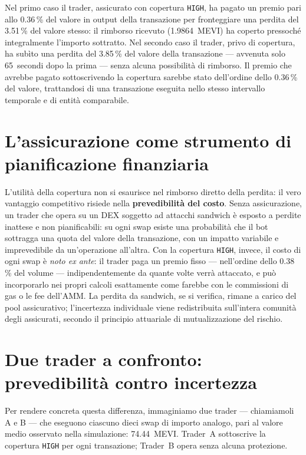 \documentclass[a4paper,11pt]{article}
\begin{document}
Nel primo caso il trader, assicurato con copertura \texttt{HIGH}, ha pagato un
premio pari allo \num{0,36}\,\% del valore in output della transazione per
fronteggiare una perdita del \num{3,51}\,\% del valore stesso: il rimborso
ricevuto (\num{1,9864}~MEVI) ha coperto pressoché integralmente l'importo
sottratto. Nel secondo caso il trader, privo di copertura, ha subìto una
perdita del \num{3,85}\,\% del valore della transazione --- avvenuta solo
65~secondi dopo la prima --- senza alcuna possibilità di rimborso. Il premio
che avrebbe pagato sottoscrivendo la copertura sarebbe stato dell'ordine dello
\num{0,36}\,\% del valore, trattandosi di una transazione eseguita nello
stesso intervallo temporale e di entità comparabile.

\section{L'assicurazione come strumento di pianificazione finanziaria}
L'utilità della copertura non si esaurisce nel rimborso diretto della perdita:
il vero vantaggio competitivo risiede nella \textbf{prevedibilità del costo}.
Senza assicurazione, un trader che opera su un DEX soggetto ad attacchi
sandwich è esposto a perdite inattese e non pianificabili: su ogni swap esiste
una probabilità che il bot sottragga una quota del valore della transazione,
con un impatto variabile e imprevedibile da un'operazione all'altra. Con la
copertura \texttt{HIGH}, invece, il costo di ogni swap è \emph{noto ex ante}:
il trader paga un premio fisso --- nell'ordine dello \num{0,38}\,\% del volume
--- indipendentemente da quante volte verrà attaccato, e può incorporarlo nei
propri calcoli esattamente come farebbe con le commissioni di gas o le fee
dell'AMM. La perdita da sandwich, se si verifica, rimane a carico del pool
assicurativo; l'incertezza individuale viene redistribuita sull'intera
comunità degli assicurati, secondo il principio attuariale di mutualizzazione
del rischio.

\section{Due trader a confronto: prevedibilità contro incertezza}

Per rendere concreta questa differenza, immaginiamo due trader --- chiamiamoli
A e B --- che eseguono ciascuno dieci swap di importo analogo, pari al valore
medio osservato nella simulazione: \num{74,44}~MEVI. Trader~A sottoscrive la
copertura \texttt{HIGH} per ogni transazione; Trader~B opera senza alcuna
protezione.
\end{document}
